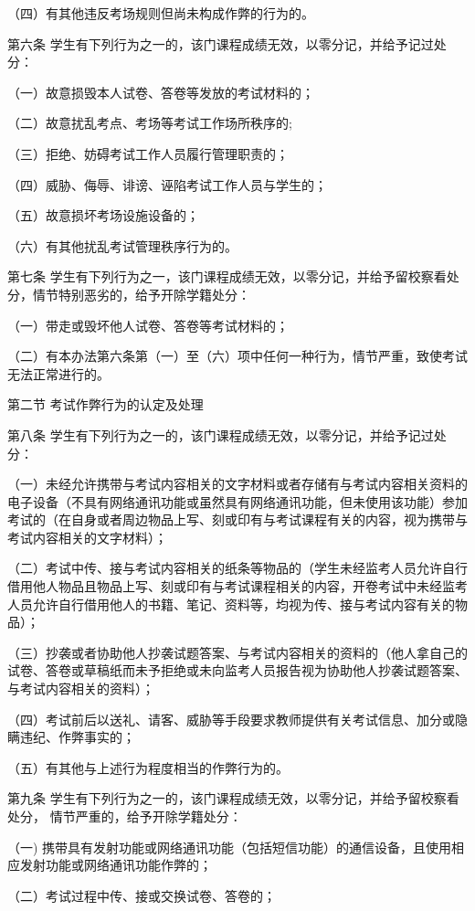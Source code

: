 \documentclass[UTF8,12pt,a4paper]{report}
\begin{document}
（四）有其他违反考场规则但尚未构成作弊的行为的。

第六条  学生有下列行为之一的，该门课程成绩无效，以零分记，并给予记过处分：

（一）故意损毁本人试卷、答卷等发放的考试材料的；

（二）故意扰乱考点、考场等考试工作场所秩序的;

（三）拒绝、妨碍考试工作人员履行管理职责的；

（四）威胁、侮辱、诽谤、诬陷考试工作人员与学生的；

（五）故意损坏考场设施设备的；

（六）有其他扰乱考试管理秩序行为的。

第七条  学生有下列行为之一，该门课程成绩无效，以零分记，并给予留校察看处分，情节特别恶劣的，给予开除学籍处分：

（一）带走或毁坏他人试卷、答卷等考试材料的；

（二）有本办法第六条第（一）至（六）项中任何一种行为，情节严重，致使考试无法正常进行的。

第二节  考试作弊行为的认定及处理

第八条  学生有下列行为之一的，该门课程成绩无效，以零分记，并给予记过处分：

（一）未经允许携带与考试内容相关的文字材料或者存储有与考试内容相关资料的电子设备（不具有网络通讯功能或虽然具有网络通讯功能，但未使用该功能）参加考试的（在自身或者周边物品上写、刻或印有与考试课程有关的内容，视为携带与考试内容相关的文字材料）；

（二）考试中传、接与考试内容相关的纸条等物品的（学生未经监考人员允许自行借用他人物品且物品上写、刻或印有与考试课程相关的内容，开卷考试中未经监考人员允许自行借用他人的书籍、笔记、资料等，均视为传、接与考试内容有关的物品）；

（三）抄袭或者协助他人抄袭试题答案、与考试内容相关的资料的（他人拿自己的试卷、答卷或草稿纸而未予拒绝或未向监考人员报告视为协助他人抄袭试题答案、与考试内容相关的资料）；

（四）考试前后以送礼、请客、威胁等手段要求教师提供有关考试信息、加分或隐瞒违纪、作弊事实的；

（五）有其他与上述行为程度相当的作弊行为的。

第九条  学生有下列行为之一的，该门课程成绩无效，以零分记，并给予留校察看处分， 情节严重的，给予开除学籍处分：

（一) 携带具有发射功能或网络通讯功能（包括短信功能）的通信设备，且使用相应发射功能或网络通讯功能作弊的；

（二）考试过程中传、接或交换试卷、答卷的；
\end{document}
